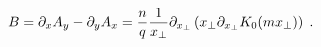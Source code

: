 \begin{equation}
B=\partial _{x}A_{y}-\partial _{y}A_{x}=\frac{n}{q}\frac{1}{x_{\mathrm{\bot }%
}}\partial _{x_{\mathrm{\bot }}}\left( x_{\mathrm{\bot }}\partial _{x_{%
\mathrm{\bot }}}K_{0}(mx_{\mathrm{\bot }})\right) \;.  \label{b}
\end{equation}

